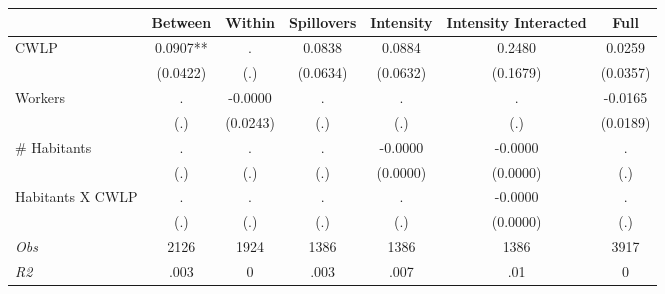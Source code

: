 \begin{tabular}{l*{6}{c}}\hline&\multicolumn{1}{c}{Between}&\multicolumn{1}{c}{Within}&\multicolumn{1}{c}{Spillovers}&\multicolumn{1}{c}{Intensity}&\multicolumn{1}{c}{Intensity Interacted}&\multicolumn{1}{c}{Full}\\ \hline 
CWLP & 0.0907** & . & 0.0838 & 0.0884 & 0.2480 & 0.0259 \\
 & (0.0422) & (.) & (0.0634) & (0.0632) & (0.1679) & (0.0357) \\
Workers & . & -0.0000 & . & . & . & -0.0165 \\
 & (.) & (0.0243) & (.) & (.) & (.) & (0.0189) \\
\# Habitants & . & . & . & -0.0000 & -0.0000 & . \\
 & (.) & (.) & (.) & (0.0000) & (0.0000) & (.) \\
Habitants X CWLP & . & . & . & . & -0.0000 & . \\
 & (.) & (.) & (.) & (.) & (0.0000) & (.) \\
\hline \textit{Obs} & 2126 & 1924 & 1386 & 1386 & 1386 & 3917 \\ \textit{R2} & .003 & 0 & .003 & .007 & .01 & 0 \\ \hline \end{tabular}
